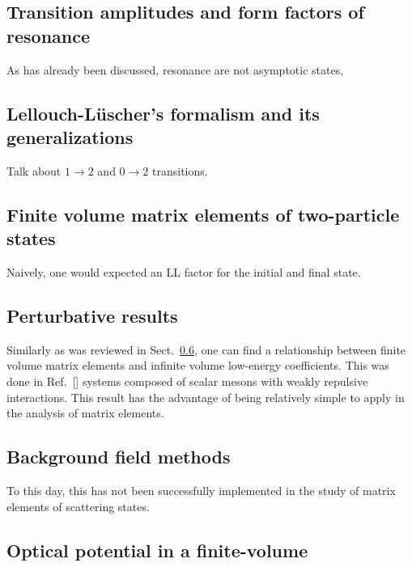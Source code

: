 \documentclass{iopart}
\theoremstyle{definition}
\begin{document}
{%
\subsection{Transition amplitudes and form factors of resonance\label{sec:trans_amps}}
As has already been discussed, resonance are not asymptotic states,  


\cite{Bernard:2012bi, Agadjanov:2014kha, Agadjanov:2016qdz}

\cite{Gegelia:2009py, Hoja:2010fm, Albaladejo:2012te}

\subsection{Lellouch-L\"uscher's formalism and its generalizations~\label{sec:LL_formalism}}
Talk about $1\to2$ and $0\to2$ transitions.
\subsection{Finite volume matrix elements of two-particle states~\label{sec:2body_mat}}
Naively, one would expected an LL factor for the initial and final state.
\subsection{Perturbative results~\label{sec:perturbative_results}}
Similarly as was reviewed in Sect.~\ref{}, one can find a relationship between finite volume matrix elements and infinite volume low-energy coefficients. This was done in Ref.~[] systems composed of scalar mesons with weakly repulsive interactions. This result has the advantage of being relatively simple to apply in the analysis of matrix elements. 
\subsection{Background field methods~\label{sec:background_field}}
To this day, this has not been successfully implemented in the study of matrix elements of scattering states. 

\cite{Davoudi:2015cba, Davoudi:2015zda}
\subsection{Optical potential in a finite-volume~\label{sec:optical_potential}}



}
\end{document}
